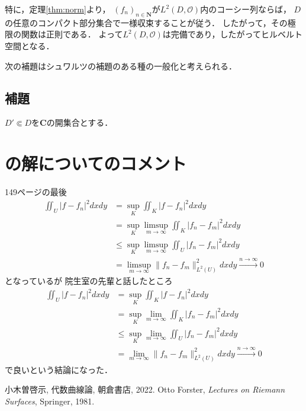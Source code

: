 \documentclass[11pt, a4paper, dvipdfmx]{jsarticle}
\theoremstyle{definition}
\newcommand{\nn}{\mathbf{N}}
\newcommand{\cc}{\mathbf{C}}
\newcommand{\mcal}{\mathcal}
\newcommand{\OO}{\mcal{O}}
\newcommand{\abs}[1]{\lvert #1 \rvert}
\newcommand{\nm}[1]{\lVert #1 \rVert}
\theoremstyle{mystyle}
\numberwithin{equation}{section} %
\begin{document}
特に，定理\ref{thm:norm}より，
$(f_n)_{n\in\nn}$が$L^2(D,\OO)$内のコーシー列ならば，
$D$の任意のコンパクト部分集合で一様収束することが従う．
したがって，その極限の関数は正則である．
よって$L^2(D,\OO)$は完備であり，したがってヒルベルト空間となる．

次の補題はシュワルツの補題のある種の一般化と考えられる．

\subsection{補題}
$D'\Subset D$を$\cc$の開集合とする．

\setcounter{section}{1}
\section{\cite[例題6.8(4)]{Og02}の解についてのコメント}
149ページの最後
\begin{align*}
  \iint_{U}\abs{f-f_n}^2dxdy
  &=\sup_{K}\iint_{K}\abs{f-f_n}^2dxdy\\
  &=\sup_K\limsup_{m\to\infty}\iint_{K}\abs{f_n-f_m}^2dxdy\\
  &\le\sup_K\limsup_{m\to\infty}\iint_{U}\abs{f_n-f_m}^2dxdy\\
  &=\limsup_{m\to\infty}\nm{f_n-f_m}^2_{L^2(U)}dxdy
  \overset{n\to\infty}{\rightarrow}0
\end{align*}
となっているが
院生室の先輩と話したところ
\begin{align*}
  \iint_{U}\abs{f-f_n}^2dxdy
  &=\sup_K\iint_{K}\abs{f-f_n}^2dxdy\\
  &=\sup_K\lim_{m\to\infty}\iint_{K}\abs{f_n-f_m}^2dxdy\\
  &\le\sup_K\lim_{m\to\infty}\iint_{U}\abs{f_n-f_m}^2dxdy\\
  &=\lim_{m\to\infty}\nm{f_n-f_m}^2_{L^2(U)}dxdy
  \overset{n\to\infty}{\rightarrow}0
\end{align*}
で良いという結論になった．
\begin{thebibliography}{20} 
   小木曽啓示, 代数曲線論, 朝倉書店, 2022.
   Otto Forster, \emph{Lectures on Riemann Surfaces}, Springer, 1981.
\end{thebibliography}
\end{document}
